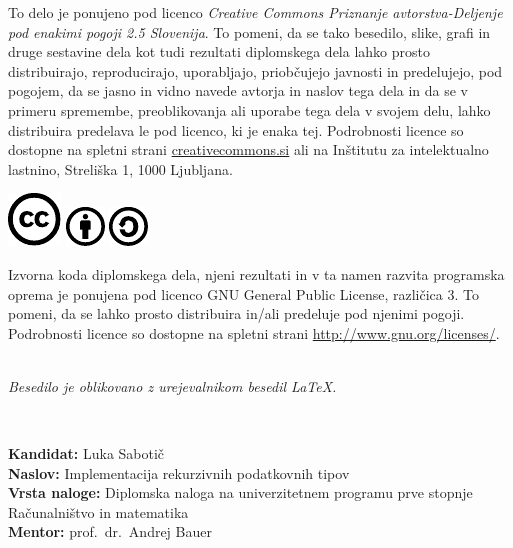 \documentclass[a4paper,12pt,openright]{book}
\newcommand{\clearemptydoublepage}{\newpage{\pagestyle{empty}\cleardoublepage}}
\newcommand{\CcImageCc}[1]{%
	\includegraphics[scale=#1]{cc_cc_30.pdf}%
}
\newcommand{\CcImageBy}[1]{%
	\includegraphics[scale=#1]{cc_by_30.pdf}%
}
\newcommand{\CcImageSa}[1]{%
	\includegraphics[scale=#1]{cc_sa_30.pdf}%
}
\begin{document}
\newpage
\thispagestyle{empty}

\vspace*{5cm}
{\small \noindent
To delo je ponujeno pod licenco \textit{Creative Commons Priznanje avtorstva-Deljenje pod enakimi pogoji 2.5 Slovenija}.
To pomeni, da se tako besedilo, slike, grafi in druge sestavine dela kot tudi rezultati diplomskega dela lahko prosto distribuirajo,
reproducirajo, uporabljajo, priobčujejo javnosti in predelujejo, pod pogojem, da se jasno in vidno navede avtorja in naslov tega
dela in da se v primeru spremembe, preoblikovanja ali uporabe tega dela v svojem delu, lahko distribuira predelava le pod
licenco, ki je enaka tej.
Podrobnosti licence so dostopne na spletni strani \href{http://creativecommons.si}{creativecommons.si} ali na Inštitutu za
intelektualno lastnino, Streliška 1, 1000 Ljubljana.

\vspace*{1cm}
\begin{center}%
\CcImageCc{0.741573033707865}\hspace*{1ex}\CcImageBy{1}\hspace*{1ex}\CcImageSa{1}%
\end{center}
}

\vspace*{1cm}
{\small \noindent
Izvorna koda diplomskega dela, njeni rezultati in v ta namen razvita programska oprema je ponujena pod licenco GNU General Public License,
različica 3. To pomeni, da se lahko prosto distribuira in/ali predeluje pod njenimi pogoji.
Podrobnosti licence so dostopne na spletni strani \url{http://www.gnu.org/licenses/}.
}

\vfill
\begin{center} 
\ \\ \vfill
{\em
Besedilo je oblikovano z urejevalnikom besedil \LaTeX.}
\end{center}

\clearemptydoublepage

\thispagestyle{empty}
\
\vfill

\bigskip
\noindent\textbf{Kandidat:} Luka Sabotič\\
\noindent\textbf{Naslov:} Implementacija rekurzivnih podatkovnih tipov\\
\noindent\textbf{Vrsta naloge:} Diplomska naloga na univerzitetnem programu prve stopnje Računalništvo in matematika \\
\noindent\textbf{Mentor:} prof.\ dr.\ Andrej Bauer\\
\end{document}
